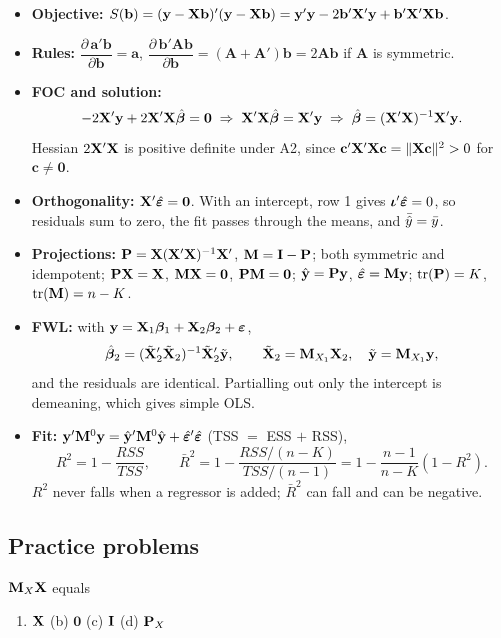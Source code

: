 \documentclass[11pt]{article}
\begin{document}
\begin{keybox}
\begin{itemize}
  \item \textbf{Objective:} $S(\mathbf b)=(\mathbf{y}-\mathbf{X}\mathbf b)'(\mathbf{y}-\mathbf{X}\mathbf b)=\mathbf{y}'\mathbf{y}-2\mathbf b'\mathbf{X}'\mathbf{y}+\mathbf b'\mathbf{X}'\mathbf{X}\mathbf b$.
  \item \textbf{Rules:} $\dfrac{\partial\,\mathbf a'\mathbf b}{\partial\mathbf b}=\mathbf a$, \quad $\dfrac{\partial\,\mathbf b'\mathbf A\mathbf b}{\partial\mathbf b}=(\mathbf A+\mathbf A')\mathbf b=2\mathbf A\mathbf b$ if $\mathbf A$ is symmetric.
  \item \textbf{FOC and solution:}
  \[ -2\mathbf{X}'\mathbf{y}+2\mathbf{X}'\mathbf{X}\hat{\bm{\beta}}=\mathbf0 \;\Rightarrow\; \mathbf{X}'\mathbf{X}\hat{\bm{\beta}}=\mathbf{X}'\mathbf{y} \;\Rightarrow\; \hat{\bm{\beta}}=(\mathbf{X}'\mathbf{X})^{-1}\mathbf{X}'\mathbf{y}. \]
  Hessian $2\mathbf{X}'\mathbf{X}$ is positive definite under A2, since $\mathbf c'\mathbf{X}'\mathbf{X}\mathbf c=\|\mathbf{X}\mathbf c\|^2>0$ for $\mathbf c\neq\mathbf0$.
  \item \textbf{Orthogonality:} $\mathbf{X}'\hat{\bm{\varepsilon}}=\mathbf0$. With an intercept, row 1 gives $\bm{\iota}'\hat{\bm{\varepsilon}}=0$, so residuals sum to zero, the fit passes through the means, and $\bar{\hat y}=\bar{y}$.
  \item \textbf{Projections:} $\mathbf{P}=\mathbf{X}(\mathbf{X}'\mathbf{X})^{-1}\mathbf{X}'$, $\mathbf{M}=\mathbf{I}-\mathbf{P}$; both symmetric and idempotent; $\mathbf{P}\mathbf{X}=\mathbf{X}$, $\mathbf{M}\mathbf{X}=\mathbf0$, $\mathbf{P}\mathbf{M}=\mathbf0$; $\hat{\mathbf{y}}=\mathbf{P}\mathbf{y}$, $\hat{\bm{\varepsilon}}=\mathbf{M}\mathbf{y}$; $\operatorname{tr}(\mathbf{P})=K$, $\operatorname{tr}(\mathbf{M})=n-K$.
  \item \textbf{FWL:} with $\mathbf{y}=\mathbf{X}_1\bm{\beta}_1+\mathbf{X}_2\bm{\beta}_2+\bm{\varepsilon}$,
  \[ \hat{\bm{\beta}}_2=(\tilde{\mathbf{X}}_2'\tilde{\mathbf{X}}_2)^{-1}\tilde{\mathbf{X}}_2'\tilde{\mathbf{y}}, \qquad \tilde{\mathbf{X}}_2=\mathbf{M}_{X_1}\mathbf{X}_2,\quad \tilde{\mathbf{y}}=\mathbf{M}_{X_1}\mathbf{y}, \]
  and the residuals are identical. Partialling out only the intercept is demeaning, which gives simple OLS.
  \item \textbf{Fit:} $\mathbf{y}'\mathbf{M}^0\mathbf{y}=\hat{\mathbf{y}}'\mathbf{M}^0\hat{\mathbf{y}}+\hat{\bm{\varepsilon}}'\hat{\bm{\varepsilon}}$ (TSS $=$ ESS $+$ RSS),
  \[ R^2=1-\frac{RSS}{TSS}, \qquad \bar R^2=1-\frac{RSS/(n-K)}{TSS/(n-1)}=1-\frac{n-1}{n-K}(1-R^2). \]
  $R^2$ never falls when a regressor is added; $\bar R^2$ can fall and can be negative.
\end{itemize}
\end{keybox}

\subsection{Practice problems}
\setcounter{prob}{0}

$\mathbf{M}_X\mathbf{X}$ equals
\begin{enumerate}[label=(\alph*)]
  \item $\mathbf{X}$ \quad (b) $\mathbf0$ \quad (c) $\mathbf{I}$ \quad (d) $\mathbf{P}_X$
\end{enumerate}
\end{document}

